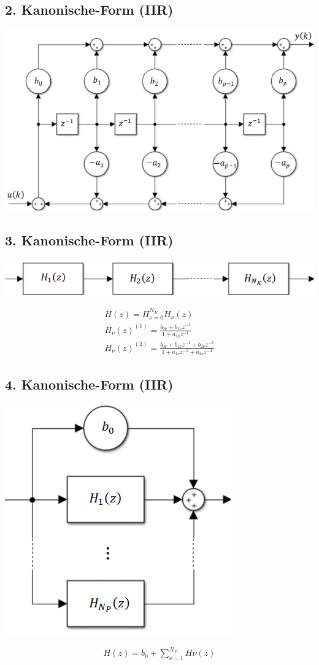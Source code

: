 \documentclass[10pt,a4paper]{article}
\begin{document}
\subsection{2. Kanonische-Form (IIR)}
  \begin{center}
      \includegraphics[width=.35\textwidth]{./img/kanon2.png}
  \end{center}
\subsection{3. Kanonische-Form (IIR)}
  \begin{center}
      \includegraphics[width=.35\textwidth]{./img/kanon3.png}
  \end{center}
  \begin{mdframed}[style=exercise]
    \begin{align}
        H(z)=\Pi_{\nu=0}^{N_K} H_\nu(z)\\
        H_\nu(z)^{(1)}=\frac{b_{0\nu}+b_{1\nu}z^{-1}}{1+a_{1\nu}z^{-1}}\\
        H_\nu(z)^{(2)}=\frac{b_{0\nu}+b_{1\nu}z^{-1}+b_{2\nu}z^{-2}}{1+a_{1\nu}z^{-1}+a_{2\nu}z^{-2}}
    \end{align}
  \end{mdframed}
\subsection{4. Kanonische-Form (IIR)}
  \begin{center}
      \includegraphics[width=.25\textwidth]{./img/kanon4.png}
  \end{center}
  \begin{mdframed}[style=exercise]
    \begin{align}
        H(z)=b_0+\sum_{\nu=1}^{N_P}H\nu(z)
    \end{align}
  \end{mdframed}
\end{document}
